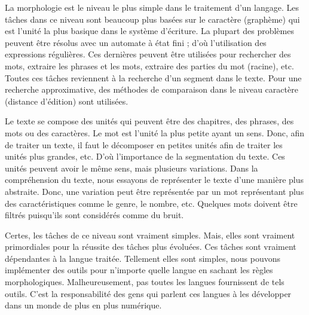\documentclass{KodeBook}
\begin{document}
\begin{discussion}
	La morphologie est le niveau le plus simple dans le traitement d'un langage. 
	Les tâches dans ce niveau sont beaucoup plus basées sur le caractère (graphème) qui est l'unité la plus basique dans le système d'écriture.  
	La plupart des problèmes peuvent être résolus avec un automate à état fini ; d'où l'utilisation des expressions régulières. 
	Ces dernières peuvent être utilisées pour rechercher des mots, extraire les phrases et les mots, extraire des parties du mot (racine), etc. 
	Toutes ces tâches reviennent à la recherche d'un segment dans le texte. 
	Pour une recherche approximative, des méthodes de comparaison dans le niveau caractère (distance d'édition) sont utilisées. 
	
	Le texte se compose des unités qui peuvent être des chapitres, des phrases, des mots ou des caractères.
	Le mot est l'unité la plus petite ayant un sens. 
	Donc, afin de traiter un texte, il faut le décomposer en petites unités  afin de traiter les unités plus grandes, etc. 
	D'où l'importance de la segmentation du texte. 
	Ces unités peuvent avoir le même sens, mais plusieurs variations. 
	Dans la compréhension du texte, nous essayons de représenter le texte d'une manière plus abstraite.
	Donc, une variation peut être représentée par un mot représentant plus des caractéristiques comme le genre, le nombre, etc. 
	Quelques mots doivent être filtrés puisqu'ils sont considérés comme du bruit.
	
	Certes, les tâches de ce niveau sont vraiment simples. 
	Mais, elles sont vraiment primordiales pour la réussite des tâches plus évoluées. 
	Ces tâches sont vraiment dépendantes à la langue traitée.
	Tellement elles sont simples, nous pouvons implémenter des outils pour n'importe quelle langue en sachant les règles morphologiques. 
	Malheureusement, pas toutes les langues fournissent de tels outils.  
	C'est la responsabilité des gens qui parlent ces langues à les développer dans un monde de plus en plus numérique.
	
\end{discussion}

\ifx\wholebook\relax\else
% 
% 
	
\end{document}
